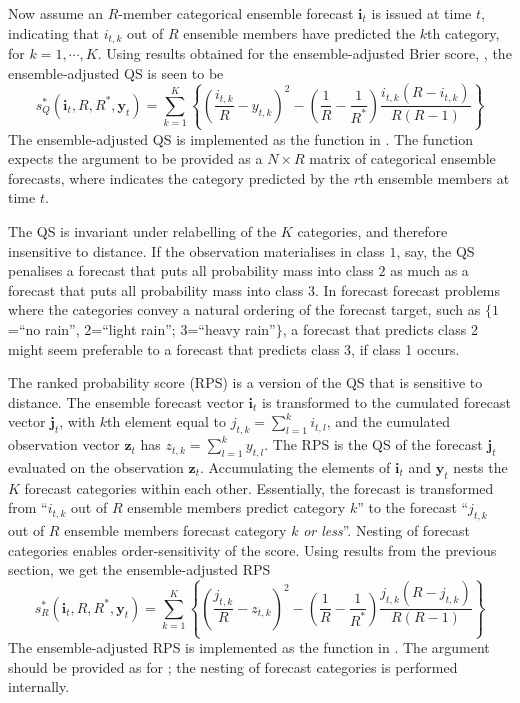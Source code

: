\documentclass[article]{jss}\usepackage{graphicx, color}
\begin{document}
Now assume an $R$-member categorical ensemble forecast $\mathbf{i}_t$ is issued at time $t$, indicating that $i_{t,k}$ out of $R$ ensemble members have predicted the $k$th category, for $k=1,\cdots,K$.
Using results obtained for the ensemble-adjusted Brier score, \citep[see also][]{ferro2008effect}, the ensemble-adjusted QS is seen to be
%
\begin{equation}
s_{Q}^*(\mathbf{i}_t, R, R^*, \mathbf{y}_t) = \sum_{k=1}^K \left\{ \left(\frac{i_{t,k}}{R} - y_{t,k}\right)^2 - \left(\frac{1}{R} - \frac{1}{R^*}\right) \frac{i_{t,k}(R-i_{t,k})}{R(R-1)}\right\}
\end{equation}
%
The ensemble-adjusted QS is implemented as the function  in .
The function expects the argument  to be provided as a $N\times R$ matrix of categorical ensemble forecasts, where  indicates the category predicted by the $r$th ensemble members at time $t$. 

The QS is invariant under relabelling of the $K$ categories, and therefore insensitive to distance. 
If the observation materialises in class $1$, say, the QS penalises a forecast that puts all probability mass into class $2$ as much as a forecast that puts all probability mass into class $3$.
In forecast forecast problems where the categories convey a natural ordering of the forecast target, such as $\{1$=``no rain'', $2$=``light rain''; $3$=``heavy rain''$\}$, a forecast that predicts class 2 might seem preferable to a forecast that predicts class 3, if class 1 occurs. 

The ranked probability score (RPS) is a version of the QS that is sensitive to distance.
The ensemble forecast vector $\mathbf{i}_t$ is transformed to the cumulated forecast vector $\mathbf{j}_t$, with $k$th element equal to $j_{t,k} = \sum_{l=1}^k i_{t,l}$, and the cumulated observation vector $\mathbf{z}_t$ has $z_{t,k} = \sum_{l=1}^k y_{t,l}$.
The RPS is the QS of the forecast $\mathbf{j}_t$ evaluated on the observation $\mathbf{z}_t$.
Accumulating the elements of $\mathbf{i}_t$ and $\mathbf{y}_t$ nests the $K$ forecast categories within each other. 
Essentially, the forecast is transformed from ``$i_{t,k}$ out of $R$ ensemble members predict category $k$'' to the forecast ``$j_{t,k}$ out of $R$ ensemble members forecast category $k$ \emph{or less}''.
Nesting of forecast categories enables order-sensitivity of the score.
Using results from the previous section, we get the ensemble-adjusted RPS
%
\begin{equation}
s_{R}^*(\mathbf{i}_t, R, R^*, \mathbf{y}_t) = \sum_{k=1}^K \left\{ \left(\frac{j_{t,k}}{R} - z_{t,k}\right)^2 - \left(\frac{1}{R} - \frac{1}{R^*}\right) \frac{j_{t,k}(R-j_{t,k})}{R(R-1)}\right\}
\end{equation}
%
The ensemble-adjusted RPS is implemented as the function  in .
The argument  should be provided as for ; the nesting of forecast categories is performed internally.
\end{document}
